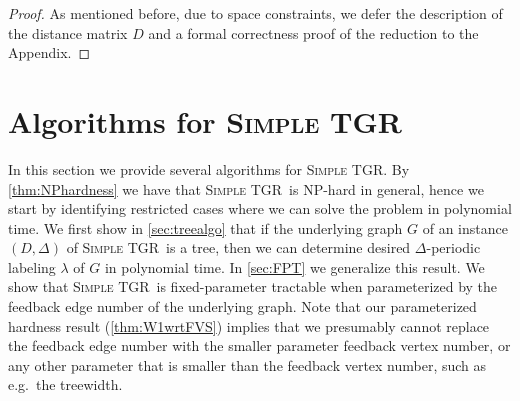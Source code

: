 \documentclass[a4paper,UKenglish,cleveref, autoref, thm-restate, anonymous]{lipics-v2021}
\newcommand{\deltaExact}{\textsc{Simple TGR}}
\begin{document}
\begin{proof}
As mentioned before, due to space constraints, we defer the description of the distance matrix $D$ and a formal correctness proof of the reduction to the Appendix.
\end{proof}



\section{Algorithms for \deltaExact}

In this section we provide several algorithms for \deltaExact. By \cref{thm:NPhardness} we have that \deltaExact\ is NP-hard in general, hence we start by identifying restricted cases where we can solve the problem in polynomial time.
We first show in \cref{sec:treealgo} that if the underlying graph $G$ of an instance $(D, \Delta)$ of \deltaExact\ is a tree, then we can determine desired $\Delta$-periodic labeling $\lambda$ of $G$ in polynomial time. In \cref{sec:FPT} we generalize this result. We show that \deltaExact\ is fixed-parameter tractable when parameterized by the feedback edge number of the underlying graph. Note that our parameterized hardness result (\cref{thm:W1wrtFVS}) implies that we presumably cannot replace the feedback edge number with the smaller parameter feedback vertex number, or any other parameter that is smaller than the feedback vertex number, such as e.g.\ the treewidth.
\end{document}
